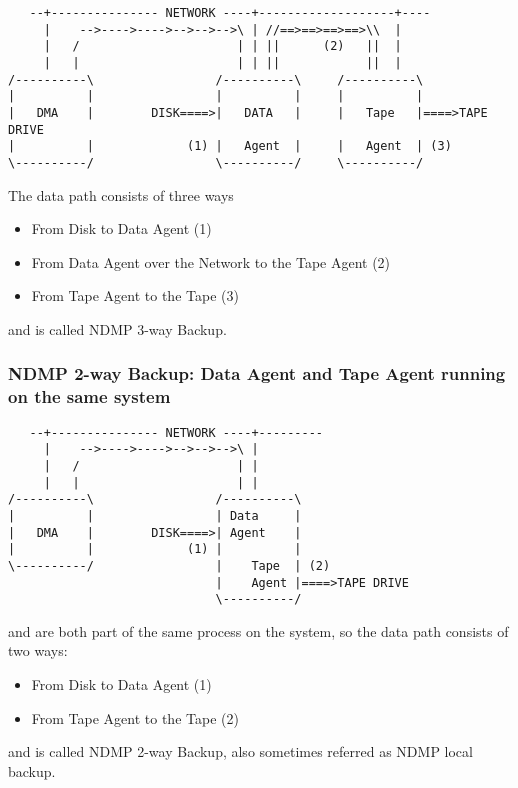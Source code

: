 \begin{verbatim}
   --+--------------- NETWORK ----+-------------------+----
     |    -->---->---->-->-->-->\ | //==>==>==>==>\\  |
     |   /                      | | ||      (2)   ||  |
     |   |                      | | ||            ||  |
/----------\                 /----------\     /----------\
|          |                 |          |     |          |
|   DMA    |        DISK====>|   DATA   |     |   Tape   |====>TAPE DRIVE
|          |             (1) |   Agent  |     |   Agent  | (3)
\----------/                 \----------/     \----------/
\end{verbatim}


The data path consists of three ways
\begin{itemize}
    \item From Disk to Data Agent (1)
    \item From Data Agent over the Network to the Tape Agent (2)
    \item From Tape Agent to the Tape (3)
\end{itemize}

and is called NDMP 3-way Backup.


\subsubsection{NDMP 2-way Backup: Data Agent and Tape Agent running on the same system}


\begin{verbatim}
   --+--------------- NETWORK ----+---------
     |    -->---->---->-->-->-->\ |
     |   /                      | |
     |   |                      | |
/----------\                 /----------\
|          |                 | Data     |
|   DMA    |        DISK====>| Agent    |
|          |             (1) |          |
\----------/                 |    Tape  | (2)
                             |    Agent |====>TAPE DRIVE
                             \----------/
\end{verbatim}


\DataAgent and \TapeAgent are both part of the same process on the system,
so the data path consists of two ways:
\begin{itemize}
    \item From Disk to Data Agent (1)
    \item From Tape Agent to the Tape (2)
\end{itemize}
and is called NDMP 2-way Backup, also sometimes referred as NDMP local backup.


